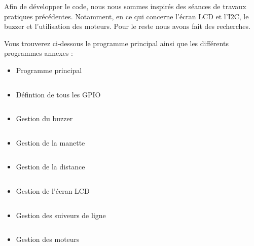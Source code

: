 Afin de développer le code, nous nous sommes inspirés des séances de travaux pratiques précédentes. Notamment, en ce qui concerne l'écran LCD et l'I2C, le buzzer et l'utilisation des moteurs. Pour le reste nous avons fait des recherches.

Vous trouverez ci-dessous le programme principal ainsi que les différents programmes annexes :

\begin{itemize}
    \item Programme principal
        \inputminted{c}{../code/src/main.c}
    \item Défintion de tous les GPIO
        \inputminted{c}{../code/include/gpioPins.h}
    \item Gestion du buzzer
        \inputminted{c}{../code/src/buzzer.c}
    \item Gestion de la manette
        \inputminted{c}{../code/src/controller.c}
    \item Gestion de la distance
        \inputminted{c}{../code/src/distance.c}
    \item Gestion de l'écran LCD
        \inputminted{c}{../code/src/i2cLCD.c}
    \item Gestion des suiveurs de ligne
        \inputminted{c}{../code/src/lineFinder.c}
    \item Gestion des moteurs
        \inputminted{c}{../code/src/motors.c}
\end{itemize}

\newpage